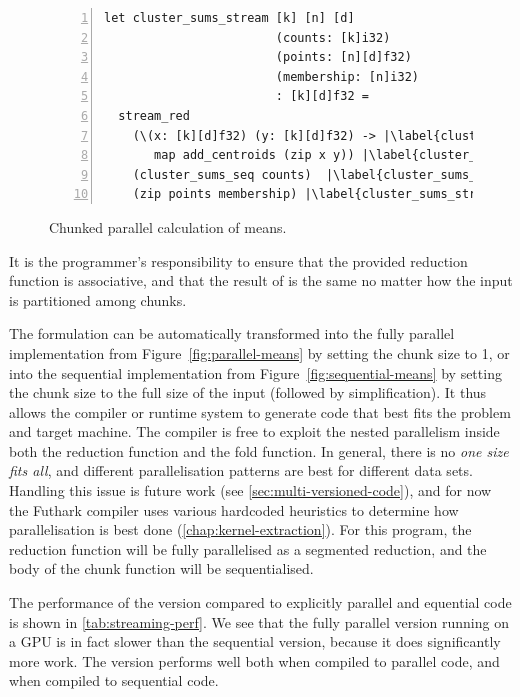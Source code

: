 \begin{figure}
\begin{lstlisting}[numbers=left,escapechar=|]
let cluster_sums_stream [k] [n] [d]
                        (counts: [k]i32)
                        (points: [n][d]f32)
                        (membership: [n]i32)
                        : [k][d]f32 =
  stream_red
    (\(x: [k][d]f32) (y: [k][d]f32) -> |\label{cluster_sums_stream_op_begin}|
       map add_centroids (zip x y)) |\label{cluster_sums_stream_op_end}|
    (cluster_sums_seq counts)  |\label{cluster_sums_stream_chunk}|
    (zip points membership) |\label{cluster_sums_stream_zip}|
\end{lstlisting}
\caption{Chunked parallel calculation of means.}
\label{fig:stream-means}
\end{figure}

It is the programmer's responsibility to ensure that the provided
reduction function is associative, and that the result of
\StreamRed{} is the same no matter how the input is partitioned
among chunks.

The \StreamRed{} formulation can be automatically transformed into the
fully parallel implementation from Figure~\ref{fig:parallel-means} by
setting the chunk size to 1, or into the sequential implementation
from Figure~\ref{fig:sequential-means} by setting the chunk size to
the full size of the input (followed by simplification).  It thus
allows the compiler or runtime system to generate code that best fits
the problem and target machine.  The compiler is free to exploit the
nested parallelism inside both the reduction function and the fold
function.  In general, there is no \textit{one size fits all}, and
different parallelisation patterns are best for different data sets.
Handling this issue is future work (see
\cref{sec:multi-versioned-code}), and for now the Futhark compiler
uses various hardcoded heuristics to determine how parallelisation is
best done (\cref{chap:kernel-extraction}).  For this program, the
reduction function will be fully parallelised as a segmented
reduction, and the body of the chunk function will be sequentialised.

The performance of the \StreamRed{} version compared to explicitly
parallel and equential code is shown in \cref{tab:streaming-perf}.  We
see that the fully parallel version running on a GPU is in fact slower
than the sequential version, because it does significantly more work.
The \StreamRed{} version performs well both when compiled to parallel
code, and when compiled to sequential code.

